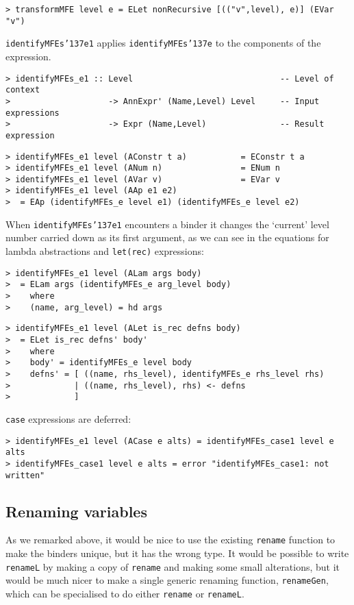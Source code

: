 \begin{verbatim}
> transformMFE level e = ELet nonRecursive [(("v",level), e)] (EVar "v")
\end{verbatim}
%
\mbox{\tt identifyMFEs{\char'137}e1} applies \mbox{\tt identifyMFEs{\char'137}e} to the components of the
expression.
\begin{verbatim}
> identifyMFEs_e1 :: Level                              -- Level of context
>                    -> AnnExpr' (Name,Level) Level     -- Input expressions
>                    -> Expr (Name,Level)               -- Result expression
\end{verbatim}
\begin{verbatim}
> identifyMFEs_e1 level (AConstr t a)           = EConstr t a
> identifyMFEs_e1 level (ANum n)                = ENum n
> identifyMFEs_e1 level (AVar v)                = EVar v
> identifyMFEs_e1 level (AAp e1 e2)
>  = EAp (identifyMFEs_e level e1) (identifyMFEs_e level e2)
\end{verbatim}
\par
When \mbox{\tt identifyMFEs{\char'137}e1} encounters a
binder it changes the `current' level number carried
down as its first argument, as we can see in the equations for lambda
abstractions and \mbox{\tt let(rec)} expressions:
\begin{verbatim}
> identifyMFEs_e1 level (ALam args body)
>  = ELam args (identifyMFEs_e arg_level body)
>    where
>    (name, arg_level) = hd args
\end{verbatim}
\begin{verbatim}
> identifyMFEs_e1 level (ALet is_rec defns body)
>  = ELet is_rec defns' body'
>    where
>    body' = identifyMFEs_e level body
>    defns' = [ ((name, rhs_level), identifyMFEs_e rhs_level rhs)
>             | ((name, rhs_level), rhs) <- defns
>             ]
\end{verbatim}
\mbox{\tt case} expressions are deferred:
\begin{verbatim}
> identifyMFEs_e1 level (ACase e alts) = identifyMFEs_case1 level e alts
> identifyMFEs_case1 level e alts = error "identifyMFEs_case1: not written"
\end{verbatim}
\subsection{Renaming variables}

As we remarked above, it would be nice to use the existing \mbox{\tt rename} function
to make the binders unique, but it has the wrong type.  It would be possible
to write \mbox{\tt renameL} by making a copy of \mbox{\tt rename} and making some small
alterations, but it would be much nicer to make a single generic renaming
function, \mbox{\tt renameGen}, which can be specialised to do either \mbox{\tt rename}
or \mbox{\tt renameL}.

